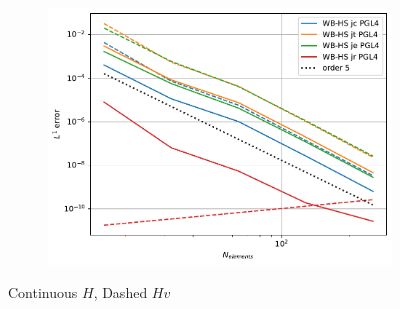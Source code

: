 \documentclass[pt12]{beamer}
\begin{document}
\begin{frame}[label=NumericalResultsWithoutWBmonodimensionalcasesSW]
\begin{figure}
     \begin{subfigure}[b]{0.30\textwidth}
         \centering
         \includegraphics[width=\textwidth]{alb_sup_convergenceWB-HS.pdf}
         \label{convergence_comp_jumps_super}
     \end{subfigure}
        \caption*{Continuous $H$, Dashed $Hv$}

        \label{convergence}
\end{figure}

\end{frame}
\end{document}
